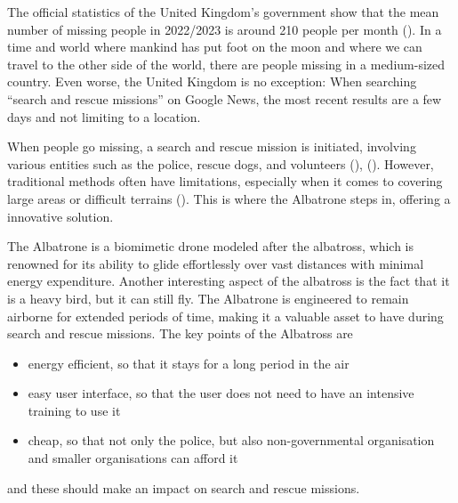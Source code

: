 The official statistics of the United Kingdom's government show that the mean number of missing people in 2022/2023 is around 210 people per month (\cite{uk_search_and_rescue_2023}). In a time and world where mankind has put foot on the moon and where we can travel to the other side of the world, there are people missing in a medium-sized country. Even worse, the United Kingdom is no exception: When searching ``search and rescue missions'' on Google News, the most recent results are a few days and not limiting to a location. 

When people go missing, a search and rescue mission is initiated, involving various entities such as the police, rescue dogs, and volunteers (\cite{ncmec_search_and_rescue}), (\cite{us_doj_search_and_rescue}). However, traditional methods often have limitations, especially when it comes to covering large areas or difficult terrains (\cite{sar_review_2020}). This is where the Albatrone steps in, offering a innovative solution.

The Albatrone is a biomimetic drone modeled after the albatross, which is renowned for its ability to glide effortlessly over vast distances with minimal energy expenditure. Another interesting aspect of the albatross is the fact that it is a heavy bird, but it can still fly. The Albatrone is engineered to remain airborne for extended periods of time, making it a valuable asset to have during search and rescue missions. The key points of the Albatross are
\begin{itemize}
    \item energy efficient, so that it stays for a long period in the air
    \item easy user interface, so that the user does not need to have an intensive training to use it
    \item cheap, so that not only the police, but also non-governmental organisation and smaller organisations can afford it
\end{itemize}
and these should make an impact on search and rescue missions.

